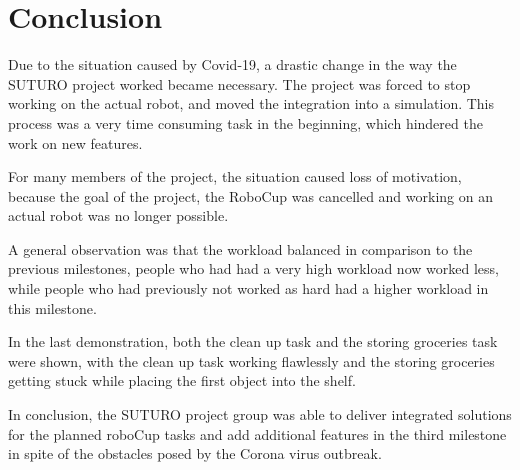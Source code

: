 \documentclass[main.tex]{subfiles}
\begin{document}
	
	\chapter{Conclusion}
	Due to the situation caused by Covid-19, a drastic change in the way the SUTURO project worked became necessary.  The project was forced to stop working on the actual robot, and moved the integration into a simulation. This process was a very time consuming task in the beginning, which hindered the work on new features.
	
	For many members of the project, the situation caused loss of motivation, because the goal of the project, the RoboCup was cancelled and working on an actual robot was no longer possible. 
	
	A general observation was that the workload balanced in comparison to the previous milestones, people who had had a very high workload now worked less, while people who had previously not worked as hard had a higher workload in this milestone.
	
	In the last demonstration, both the clean up task and the storing groceries task were shown, with the clean up task working flawlessly and the storing groceries getting stuck while placing the first object into the shelf.
	
	In conclusion, the SUTURO project group was able to deliver integrated solutions for the planned roboCup tasks and add additional features in the third milestone in spite of the obstacles posed by the Corona virus outbreak. 


	
\end{document}
